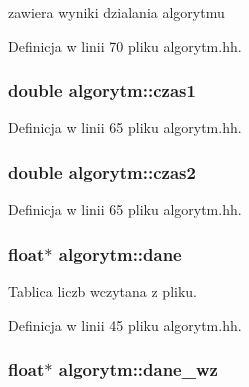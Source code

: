 zawiera wyniki dzialania algorytmu 



Definicja w linii 70 pliku algorytm.\-hh.

\hypertarget{classalgorytm_a4dae8e390930e55b11f9e0f4efd9edaf}{
\subsubsection[{czas1}]{\setlength{\rightskip}{0pt plus 5cm}double algorytm\-::czas1\hspace{0.3cm}{\ttfamily [protected]}}}\label{classalgorytm_a4dae8e390930e55b11f9e0f4efd9edaf}


Definicja w linii 65 pliku algorytm.\-hh.

\hypertarget{classalgorytm_abf8a655cd9b1acea00ba90893d38567b}{
\subsubsection[{czas2}]{\setlength{\rightskip}{0pt plus 5cm}double algorytm\-::czas2\hspace{0.3cm}{\ttfamily [protected]}}}\label{classalgorytm_abf8a655cd9b1acea00ba90893d38567b}


Definicja w linii 65 pliku algorytm.\-hh.

\hypertarget{classalgorytm_a5dd6d510b611002cfb9737f12eeff63f}{
\subsubsection[{dane}]{\setlength{\rightskip}{0pt plus 5cm}float$\ast$ algorytm\-::dane\hspace{0.3cm}{\ttfamily [protected]}}}\label{classalgorytm_a5dd6d510b611002cfb9737f12eeff63f}


Tablica liczb wczytana z pliku. 



Definicja w linii 45 pliku algorytm.\-hh.

\hypertarget{classalgorytm_a93fb0f7a64eb1e4f8492445395f98e5f}{
\subsubsection[{dane\-\_\-wz}]{\setlength{\rightskip}{0pt plus 5cm}float$\ast$ algorytm\-::dane\-\_\-wz\hspace{0.3cm}{\ttfamily [protected]}}}\label{classalgorytm_a93fb0f7a64eb1e4f8492445395f98e5f}


